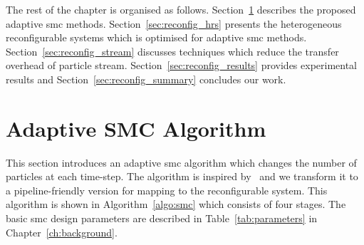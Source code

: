 The rest of the chapter is organised as follows.
Section~\ref{sec:reconfig_asmc} describes the proposed adaptive \gls{smc} methods.
Section~\ref{sec:reconfig_hrs} presents the heterogeneous reconfigurable systems which is optimised for adaptive \gls{smc} methods.
Section~\ref{sec:reconfig_stream} discusses techniques which reduce the transfer overhead of particle stream.
Section~\ref{sec:reconfig_results} provides experimental results and
Section~\ref{sec:reconfig_summary} concludes our work.

\section{Adaptive SMC Algorithm}
\label{sec:reconfig_asmc}

This section introduces an adaptive \gls{smc} algorithm which changes the number of particles at each time-step.
The algorithm is inspired by~\cite{liu07} and we transform it to a pipeline-friendly version for mapping to the reconfigurable system.
This algorithm is shown in Algorithm~\ref{algo:smc} which consists of four stages.
The basic \gls{smc} design parameters are described in Table~\ref{tab:parameters} in Chapter~\ref{ch:background}.

